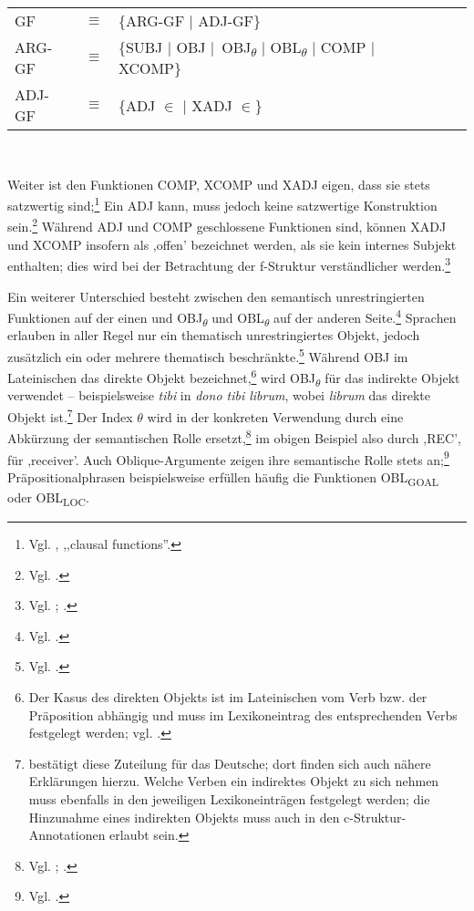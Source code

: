 \documentclass[12pt,a4paper]{article}
\begin{document}
\begin{singlespace}
\begin{tabular}{ l  l  l  c  c  c  c }
GF & $\equiv$ & \{ARG-GF $\mid$ ADJ-GF\} \\
ARG-GF & $\equiv$ & \{SUBJ $\mid$ OBJ $\mid$\ OBJ\textsubscript{$\theta$} $\mid$ OBL\textsubscript{$\theta$} $\mid$ COMP $\mid$ XCOMP\} \\
ADJ-GF & $\equiv$ & \{ADJ $\in$ $\mid$ XADJ $\in$\} \\
\end{tabular}\\
\end{singlespace}

Weiter ist den Funktionen COMP, XCOMP und XADJ eigen, dass sie stets satzwertig sind;\footnote{Vgl. \cite[24]{Dal}, ,,clausal functions''.} Ein ADJ kann, muss jedoch keine satzwertige Konstruktion sein.\footnote{Vgl. \cite[40]{Skript}.} Während ADJ und COMP geschlossene Funktionen sind, können XADJ und XCOMP insofern als ,offen' bezeichnet werden, als sie kein internes Subjekt enthalten; dies wird bei der Betrachtung der f-Struktur verständlicher werden.\footnote{Vgl. \cite[10; 14; 24]{Dal}; \cite[54]{Skript}.}

Ein weiterer Unterschied besteht zwischen den semantisch unrestringierten Funktionen auf der einen und OBJ\textsubscript{$\theta$} und OBL\textsubscript{$\theta$} auf der anderen Seite.\footnote{Vgl. \cite[10; 15-7]{Dal}.} Sprachen erlauben in aller Regel nur ein thematisch unrestringiertes Objekt, jedoch zusätzlich ein oder mehrere thematisch beschränkte.\footnote{Vgl. \cite[21]{Dal}.} Während OBJ im Lateinischen das direkte Objekt bezeichnet,\footnote{Der Kasus des direkten Objekts ist im Lateinischen vom Verb bzw. der Präposition abhängig und muss im Lexikoneintrag des entsprechenden Verbs festgelegt werden; vgl. \cite[30]{Skript}.} wird OBJ\textsubscript{$\theta$} für das indirekte Objekt verwendet – beispielsweise \textit{tibi} in \textit{dono tibi librum}, wobei \textit{librum} das direkte Objekt ist.\footnote{\cite[30]{Skript} bestätigt diese Zuteilung für das Deutsche; dort finden sich auch nähere Erklärungen hierzu. Welche Verben ein indirektes Objekt zu sich nehmen muss ebenfalls in den jeweiligen Lexikoneinträgen festgelegt werden; die Hinzunahme eines indirekten Objekts muss auch in den c-Struktur-Annotationen erlaubt sein.} Der Index $\theta$ wird in der konkreten Verwendung durch eine Abkürzung der semantischen Rolle ersetzt,\footnote{Vgl. \cite[32]{Skript}; \cite[21]{Rohrer}.} im obigen Beispiel also durch ,REC', für ,receiver'. Auch Oblique-Argumente zeigen ihre semantische Rolle stets an;\footnote{Vgl. \cite[26]{Dal}.} Präpositionalphrasen beispielsweise erfüllen häufig die Funktionen OBL\textsubscript{GOAL} oder OBL\textsubscript{LOC}.
\end{document}
